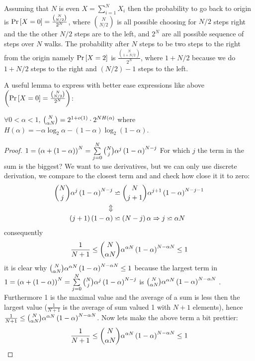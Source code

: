 Assuming that $N$ is even $X=\sum\limits _{i=1}^{N}X_{i}$ then the
probability to go back to origin is $\Pr\left[X=0\right]=\frac{\binom{N}{N/2}}{2^{N}}$,
where $\binom{N}{N/2}$ is all possible choosing for $N/2$ steps
right and the the other $N/2$ steps are to the left, and $2^{N}$
are all possible sequence of steps over $N$ walks. The probability
after $N$ steps to be two steps to the right from the origin namely
$\Pr\left[X=2\right]$ is $\frac{\binom{N}{1+N/2}}{2^{N}}$, where $1+N/2$ because
we do $1+N/2$ steps to the right and $\left(N/2\right)-1$ steps
to the left.

A useful lemma to express with better ease expressions like above
$\left(\Pr\left[X=0\right]=\frac{\binom{N}{N/2}}{2^{N}}\right)$:
\begin{lemma}
$\forall0<\alpha<1$, $\binom{N}{\alpha N}=2^{1+o\left(1\right)}\cdot2^{NH\left(\alpha\right)}$
where $H\left(\alpha\right)=-\alpha\log_{2}\alpha-\left(1-\alpha\right)\log_{2}\left(1-\alpha\right)$.
\begin{proof}
$1=\left(\alpha+\left(1-\alpha\right)\right)^{N}=\sum\limits _{j=0}^{N}\binom{N}{j}\alpha^{j}\left(1-\alpha\right)^{N-j}$
For which $j$ the term in the sum is the biggest? We want to use
derivatives, but we can only use discrete derivation, we compare to
the closest term and and check how close it it to zero: 
\begin{align*}
\binom{N}{j}\alpha^{j}\left(1-\alpha\right)^{N-j} & \backsimeq\binom{N}{j+1}\alpha^{j+1}\left(1-\alpha\right)^{N-j-1}\\
\Updownarrow\\
\left(j+1\right)\left(1-\alpha\right) & \backsimeq\left(N-j\right)\alpha\Rightarrow j\backsimeq\alpha N
\end{align*}
 consequently 
\[
\frac{1}{N+1}\le\binom{N}{\alpha N}\alpha^{\alpha N}\left(1-\alpha\right)^{N-\alpha N}\le1
\]
 it is clear why $\binom{N}{\alpha N}\alpha^{\alpha N}\left(1-\alpha\right)^{N-\alpha N}\le1$
because the largest term in $1=\left(\alpha+\left(1-\alpha\right)\right)^{N}=\sum\limits _{j=0}^{N}\binom{N}{j}\alpha^{j}\left(1-\alpha\right)^{N-j}$
is $\binom{N}{\alpha N}\alpha^{\alpha N}\left(1-\alpha\right)^{N-\alpha N}$
. Furthermore 1 is the maximal value and the average of a sum is less
then the largest value ($\frac{1}{N+1}$ is the average of sum valued
1 with $N+1$ elements), hence $\frac{1}{N+1}\le\binom{N}{\alpha N}\alpha^{\alpha N}\left(1-\alpha\right)^{N-\alpha N}$.
Now lets make the above term a bit prettier:
\begin{align*}
\frac{1}{N+1} & \le\bin N{\alpha N}\alpha^{\alpha N}\left(1-\alpha\right)^{N-\alpha N}\le1\\

\end{align*}
\end{proof}
\end{lemma}
